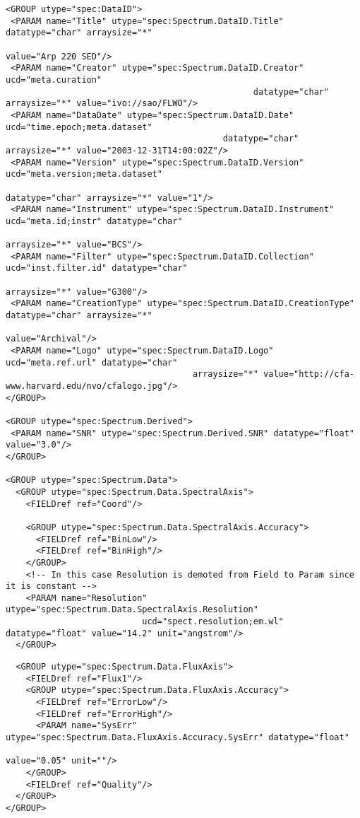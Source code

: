 {\begin{flushleft}
\begin{fmpage}
\begin{verbatim}
<GROUP utype="spec:DataID">
 <PARAM name="Title" utype="spec:Spectrum.DataID.Title" datatype="char" arraysize="*"
                                                                                  value="Arp 220 SED"/>
 <PARAM name="Creator" utype="spec:Spectrum.DataID.Creator" ucd="meta.curation" 
                                                 datatype="char" arraysize="*" value="ivo://sao/FLWO"/>
 <PARAM name="DataDate" utype="spec:Spectrum.DataID.Date" ucd="time.epoch;meta.dataset"
                                           datatype="char" arraysize="*" value="2003-12-31T14:00:02Z"/>
 <PARAM name="Version" utype="spec:Spectrum.DataID.Version" ucd="meta.version;meta.dataset"
                                                              datatype="char" arraysize="*" value="1"/>
 <PARAM name="Instrument" utype="spec:Spectrum.DataID.Instrument" ucd="meta.id;instr" datatype="char" 
                                                                            arraysize="*" value="BCS"/>
 <PARAM name="Filter" utype="spec:Spectrum.DataID.Collection" ucd="inst.filter.id" datatype="char" 
                                                                           arraysize="*" value="G300"/>
 <PARAM name="CreationType" utype="spec:Spectrum.DataID.CreationType" datatype="char" arraysize="*" 
                                                                                     value="Archival"/>
 <PARAM name="Logo" utype="spec:Spectrum.DataID.Logo" ucd="meta.ref.url" datatype="char" 
                                     arraysize="*" value="http://cfa-www.harvard.edu/nvo/cfalogo.jpg"/>
</GROUP>

<GROUP utype="spec:Spectrum.Derived">
 <PARAM name="SNR" utype="spec:Spectrum.Derived.SNR" datatype="float" value="3.0"/>
</GROUP>

<GROUP utype="spec:Spectrum.Data">
  <GROUP utype="spec:Spectrum.Data.SpectralAxis">
    <FIELDref ref="Coord"/>

    <GROUP utype="spec:Spectrum.Data.SpectralAxis.Accuracy">
      <FIELDref ref="BinLow"/>
      <FIELDref ref="BinHigh"/>
    </GROUP>
    <!-- In this case Resolution is demoted from Field to Param since it is constant -->
    <PARAM name="Resolution" utype="spec:Spectrum.Data.SpectralAxis.Resolution" 
                           ucd="spect.resolution;em.wl" datatype="float" value="14.2" unit="angstrom"/>
  </GROUP>

\end{verbatim}
\end{fmpage}

\begin{fmpage}
\begin{verbatim}
  <GROUP utype="spec:Spectrum.Data.FluxAxis">
    <FIELDref ref="Flux1"/>
    <GROUP utype="spec:Spectrum.Data.FluxAxis.Accuracy">
      <FIELDref ref="ErrorLow"/>
      <FIELDref ref="ErrorHigh"/>
      <PARAM name="SysErr" utype="spec:Spectrum.Data.FluxAxis.Accuracy.SysErr" datatype="float"
                                                                                 value="0.05" unit=""/>
    </GROUP>
    <FIELDref ref="Quality"/>
  </GROUP>
</GROUP>


\end{verbatim}
\end{fmpage}
\end{flushleft}}
